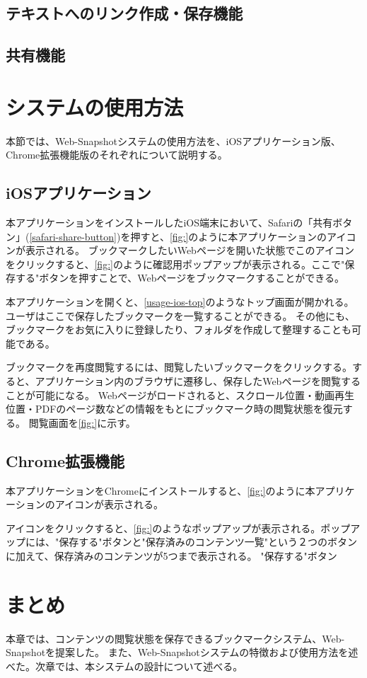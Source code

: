 \subsection{テキストへのリンク作成・保存機能}
\subsection{共有機能}

\section{システムの使用方法}
本節では、Web-Snapshotシステムの使用方法を、iOSアプリケーション版、Chrome拡張機能版のそれぞれについて説明する。

\subsection{iOSアプリケーション}
本アプリケーションをインストールしたiOS端末において、Safariの「共有ボタン」(\ref{safari-share-button})を押すと、\ref{fig:}のように本アプリケーションのアイコンが表示される。
ブックマークしたいWebページを開いた状態でこのアイコンをクリックすると、\ref{fig:}のように確認用ポップアップが表示される。ここで"保存する"ボタンを押すことで、Webページをブックマークすることができる。

本アプリケーションを開くと、\ref{usage-ios-top}のようなトップ画面が開かれる。ユーザはここで保存したブックマークを一覧することができる。
その他にも、ブックマークをお気に入りに登録したり、フォルダを作成して整理することも可能である。

ブックマークを再度閲覧するには、閲覧したいブックマークをクリックする。すると、アプリケーション内のブラウザに遷移し、保存したWebページを閲覧することが可能になる。
Webページがロードされると、スクロール位置・動画再生位置・PDFのページ数などの情報をもとにブックマーク時の閲覧状態を復元する。
閲覧画面を\ref{fig:}に示す。

\subsection{Chrome拡張機能}
本アプリケーションをChromeにインストールすると、\ref{fig:}のように本アプリケーションのアイコンが表示される。

アイコンをクリックすると、\ref{fig:}のようなポップアップが表示される。ポップアップには、"保存する"ボタンと"保存済みのコンテンツ一覧"という２つのボタンに加えて、保存済みのコンテンツが5つまで表示される。
"保存する"ボタン

\section{まとめ}
本章では、コンテンツの閲覧状態を保存できるブックマークシステム、Web-Snapshotを提案した。
また、Web-Snapshotシステムの特徴および使用方法を述べた。次章では、本システムの設計について述べる。
